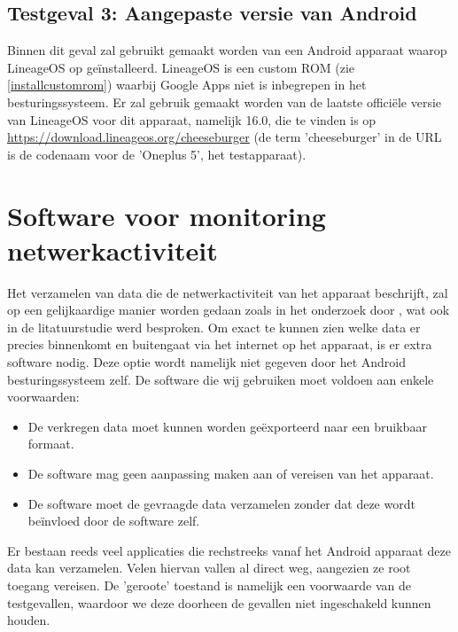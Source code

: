 \subsection{Testgeval 3: Aangepaste versie van Android}
\label{sec:testgeval3}
Binnen dit geval zal gebruikt gemaakt worden van een Android apparaat waarop LineageOS op geïnstalleerd. LineageOS is een custom ROM (zie \ref{installcustomrom}) waarbij Google Apps niet is inbegrepen in het besturingssysteem. Er zal gebruik gemaakt worden van de laatste officiële versie van LineageOS voor dit apparaat, namelijk 16.0, die te vinden is op \url{https://download.lineageos.org/cheeseburger} (de term 'cheeseburger' in de URL is de codenaam voor de 'Oneplus 5', het testapparaat).

\section{Software voor monitoring netwerkactiviteit}
\label{sec:metingsoftware}
Het verzamelen van data die de netwerkactiviteit van het apparaat beschrijft, zal op een gelijkaardige manier worden gedaan zoals in het onderzoek door \cite{schmidt_google-data-collection}, wat ook in de litatuurstudie werd besproken. Om exact te kunnen zien welke data er precies binnenkomt en buitengaat via het internet op het apparaat, is er extra software nodig. Deze optie wordt namelijk niet gegeven door het Android besturingssysteem zelf. De software die wij gebruiken moet voldoen aan enkele voorwaarden:
\begin{itemize}
    \item De verkregen data moet kunnen worden geëxporteerd naar een bruikbaar formaat.
    \item De software mag geen aanpassing maken aan of vereisen van het apparaat.
    \item De software moet de gevraagde data verzamelen zonder dat deze wordt beïnvloed door de software zelf.
\end{itemize}
Er bestaan reeds veel applicaties die rechstreeks vanaf het Android apparaat deze data kan verzamelen. Velen hiervan vallen al direct weg, aangezien ze root toegang vereisen. De 'geroote' toestand is namelijk een voorwaarde van de testgevallen, waardoor we deze doorheen de gevallen niet ingeschakeld kunnen houden. 

